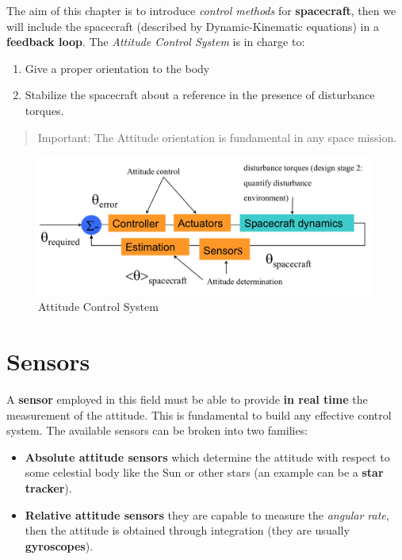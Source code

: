 The aim of this chapter is to introduce \textit{control methods} for \textbf{spacecraft}, then we will include the spacecraft (described by Dynamic-Kinematic equations) in a \textbf{feedback loop}. The \textit{Attitude Control System} is in charge to:
\begin{enumerate}
    \item Give a proper orientation to the body
    \item Stabilize the spacecraft about a reference in the presence of disturbance torques.
\end{enumerate}
\begin{quote}
    \textsf{
        Important: The Attitude orientation is fundamental in any space mission.
    }
\end{quote}

\begin{figure}[h]
    \centering
    \includegraphics[scale=0.6]{AerospaceApplications/images/ACS.png}
    \caption{Attitude Control System}
\end{figure}

\section{Sensors}
A \textbf{sensor} employed in this field must be able to provide \textbf{in real time} the measurement of the attitude. This is fundamental to build any effective control system. The available sensors can be broken into two families:
\begin{itemize}
    \item \textbf{Absolute attitude sensors} which determine the attitude with respect to some celestial body like the Sun or other stars (an example can be a \textbf{star tracker}).
    \item  \textbf{Relative attitude sensors} they are capable to measure the \textit{angular rate}, then the attitude is obtained through integration (they are usually \textbf{gyroscopes}).
\end{itemize}

